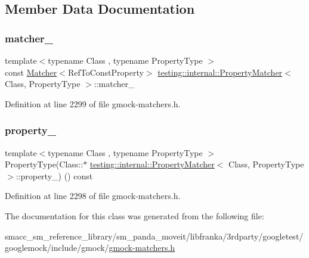 \subsection{Member Data Documentation}
\mbox{\label{classtesting_1_1internal_1_1PropertyMatcher_af7733557fde1558190ab9c63d23f1305}} 
\subsubsection{\texorpdfstring{matcher\+\_\+}{matcher\_}}
{\footnotesize\ttfamily template$<$typename Class , typename Property\+Type $>$ \\
const \hyperlink{classtesting_1_1Matcher}{Matcher}$<$Ref\+To\+Const\+Property$>$ \hyperlink{classtesting_1_1internal_1_1PropertyMatcher}{testing\+::internal\+::\+Property\+Matcher}$<$ Class, Property\+Type $>$\+::matcher\+\_\+\hspace{0.3cm}{\ttfamily [private]}}



Definition at line 2299 of file gmock-\/matchers.\+h.

\mbox{\label{classtesting_1_1internal_1_1PropertyMatcher_a3c7a303b73d6130ba775932a7c26b92d}} 
\subsubsection{\texorpdfstring{property\+\_\+}{property\_}}
{\footnotesize\ttfamily template$<$typename Class , typename Property\+Type $>$ \\
Property\+Type(Class\+::$\ast$ \hyperlink{classtesting_1_1internal_1_1PropertyMatcher}{testing\+::internal\+::\+Property\+Matcher}$<$ Class, Property\+Type $>$\+::property\+\_\+) () const\hspace{0.3cm}{\ttfamily [private]}}



Definition at line 2298 of file gmock-\/matchers.\+h.



The documentation for this class was generated from the following file\+:\begin{DoxyCompactItemize}
\item 
smacc\+\_\+sm\+\_\+reference\+\_\+library/sm\+\_\+panda\+\_\+moveit/libfranka/3rdparty/googletest/googlemock/include/gmock/\hyperlink{gmock-matchers_8h}{gmock-\/matchers.\+h}\end{DoxyCompactItemize}
